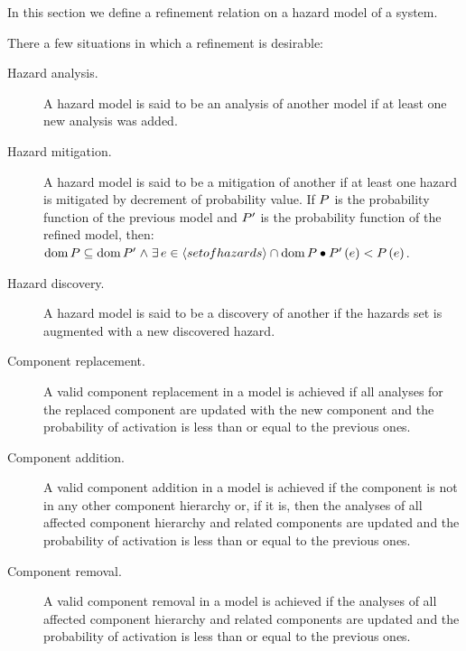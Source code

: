 In this section we define a refinement relation on a hazard model of a system.


There a few situations in which a refinement is desirable:
\begin{description}
  \item[Hazard analysis.] A hazard model is said to be an analysis of another model if at least one new analysis was added.
  \item[Hazard mitigation.] A hazard model is said to be a mitigation of another if at least one hazard is mitigated by decrement of probability value. If $P$ is the probability function of the previous model and $P'$ is the probability function of the refined model, then: 
%
\\$\hmdom{\hmprobabilitysymbol} \subseteq \hmdom{\hmprobabilitysymbol'} \land%
\hmexists{e \in \hminter{\hmseqenum{set of hazards}}{\hmdom{\hmprobabilitysymbol}}}{%
\hmprobability[\hmprobabilitysymbol']{e} < \hmprobability{e}%
}$.
  \item[Hazard discovery.] A hazard model is said to be a discovery of another if the hazards set is augmented with a new discovered hazard.
  \item[Component replacement.] A valid component replacement in a model is achieved if all analyses for the replaced component are updated with the new component and the probability of activation is less than or equal to the previous ones.
  \item[Component addition.] A valid component addition in a model is achieved if the component is not in any other component hierarchy or, if it is, then the analyses of all affected component hierarchy and related components are updated and the probability of activation is less than or equal to the previous ones.
  \item[Component removal.] A valid component removal in a model is achieved if the analyses of all affected component hierarchy and related components are updated and the probability of activation is less than or equal to the previous ones. 
\end{description}

